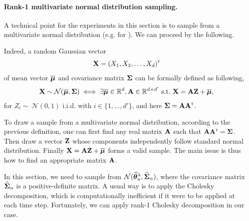 \paragraph{Rank-1 multivariate normal distribution sampling.}
A technical point for the experiments in this section is to sample from a multivariate normal distribution (e.g. for \LTCC{}). We can proceed by the following.

Indeed, a random Gaussian vector 
\[
    {\bf X} = (X_1, X_2, \ldots, X_d)^\mathsf{\scriptscriptstyle T}
\] 
of mean vector $\overline{{\boldsymbol \mu}}$ and covariance matrix ${\boldsymbol \Sigma}$ can be formally defined as following,
\[
    \bX \sim \cN(\bar{\bmu}, \bSigma) \iff \exists \bar{\bmu}\in\mathbb{R}^d,\bA\in\mathbb{R}^{d\times d'} \ \text{s.t.} \ \bX = \bA \mathbf{Z} + \bar{\bmu},
\]
for $Z_i \sim\ \mathcal{N}(0, 1)$ i.i.d. with $i\in\{1,\ldots,d'\}$, and here ${\boldsymbol \Sigma} = {\bf A}{\bf A}^\mathsf{\scriptscriptstyle T}$.

To draw a sample from a multivariate normal distribution, according to the previous definition, one can first find any real matrix ${\bf A}$ such that ${\bf A}{\bf A}^\mathsf{\scriptscriptstyle T} = {\boldsymbol \Sigma}$. Then draw a vector ${\bf Z}$ whose components independently follow standard normal distribution. Finally ${\bf X} = {\bf A} \mathbf{Z} + \overline{{\boldsymbol \mu}}$ forms a valid sample. The main issue is thus how to find an appropriate matrix ${\bf A}$.

In this section, we need to sample from $\mathcal{N}(\widehat{{\boldsymbol \theta}}^\lambda_n,\widehat{{\boldsymbol \Sigma}}_n)$, where the covariance matrix $\widehat{{\boldsymbol \Sigma}}_n$ is a positive-definite matrix. A usual way is to apply the Cholesky decomposition, which is computationally inefficient if it were to be applied at each time step. Fortunately, we can apply rank-1 Cholesky decomposition in our case.  



